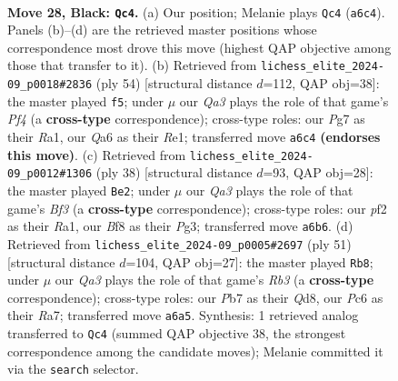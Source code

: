 \documentclass[11pt]{article}
\begin{document}
\clearpage

\begin{figure}[p]\centering
\begin{subfigure}{0.46\textwidth}\centering
\resizebox{\linewidth}{!}{%
\newchessgame
\chessboard[
  setfen={rk3b2/pp4pr/q1p1b2p/P2p1p2/3P3P/2B1PN2/1PK2PP1/1R3Q1R b - - 8 28},
  showmover=false,
  pgfstyle=straightmove, color=movearrow, markmove={a6-c4}
]}
\caption{}
\end{subfigure}\hfill
\begin{subfigure}{0.46\textwidth}\centering
\resizebox{\linewidth}{!}{%
\newchessgame
\chessboard[
  setfen={1k1qr3/pp2rpp1/1bp3p1/3p2Pn/1P3P1P/P1PP1Q1B/2KB4/R3R3 w - - 3 28},
  showmover=false,
  pgfstyle=straightmove, color=movearrow, markmove={f4-f5}
]}
\caption{}
\end{subfigure}
\\[4pt]
\begin{subfigure}{0.46\textwidth}\centering
\resizebox{\linewidth}{!}{%
\newchessgame
\chessboard[
  setfen={r4r2/1pq1p1k1/p2p1p1p/3Pn1p1/2pQP3/2P2BP1/PP3PP1/R3R1K1 w - - 0 20},
  showmover=false,
  pgfstyle=straightmove, color=movearrow, markmove={f3-e2}
]}
\caption{}
\end{subfigure}\hfill
\begin{subfigure}{0.46\textwidth}\centering
\resizebox{\linewidth}{!}{%
\newchessgame
\chessboard[
  setfen={3q2k1/r4pb1/1r1p2p1/1Bp1p2p/p1P5/PbNP2P1/1R1QPP1P/5RK1 b - - 3 26},
  showmover=false,
  pgfstyle=straightmove, color=movearrow, markmove={b6-b8}
]}
\caption{}
\end{subfigure}
\caption{\textbf{Move 28, Black: \texttt{Qc4}.} (a) Our position; Melanie plays \texttt{Qc4} (\texttt{a6c4}). Panels (b)--(d) are the retrieved master positions whose correspondence most drove this move (highest QAP objective among those that transfer to it). (b) Retrieved from \texttt{lichess\_elite\_2024-09\_p0018\#2836} (ply 54) [structural distance $d$=112, QAP obj=38]: the master played \texttt{f5}; under $\mu$ our \emph{Qa3} plays the role of that game's \emph{Pf4} (a \textbf{cross-type} correspondence); cross-type roles: our \emph{P}g7 as their \emph{R}a1, our \emph{Q}a6 as their \emph{R}e1; transferred move \texttt{a6c4} \textbf{(endorses this move)}. (c) Retrieved from \texttt{lichess\_elite\_2024-09\_p0012\#1306} (ply 38) [structural distance $d$=93, QAP obj=28]: the master played \texttt{Be2}; under $\mu$ our \emph{Qa3} plays the role of that game's \emph{Bf3} (a \textbf{cross-type} correspondence); cross-type roles: our \emph{p}f2 as their \emph{R}a1, our \emph{B}f8 as their \emph{P}g3; transferred move \texttt{a6b6}. (d) Retrieved from \texttt{lichess\_elite\_2024-09\_p0005\#2697} (ply 51) [structural distance $d$=104, QAP obj=27]: the master played \texttt{Rb8}; under $\mu$ our \emph{Qa3} plays the role of that game's \emph{Rb3} (a \textbf{cross-type} correspondence); cross-type roles: our \emph{P}b7 as their \emph{Q}d8, our \emph{P}c6 as their \emph{R}a7; transferred move \texttt{a6a5}. Synthesis: 1 retrieved analog transferred to \texttt{Qc4} (summed QAP objective 38, the strongest correspondence among the candidate moves); Melanie committed it via the \texttt{search} selector.}
\label{fig:thought-m55}
\end{figure}
\end{document}
